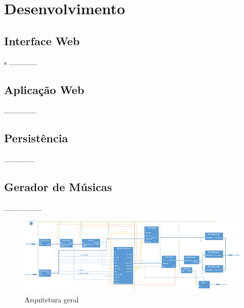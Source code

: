\documentclass{report}
\begin{document}
	



\chapter{Desenvolvimento}
\label{chap.desenvolvimento}
	
\section{Interface Web}s
..............

\section{Aplicação Web}
................

\section{Persistência}
...............

\section{Gerador de Músicas}
...................



	\begin{figure} [t]
		\centering
		\includegraphics[scale=0.6, angle = 90]{img/arq_final.PNG}
		\caption{Arquitetura geral}
	\end{figure}
\end{document}
